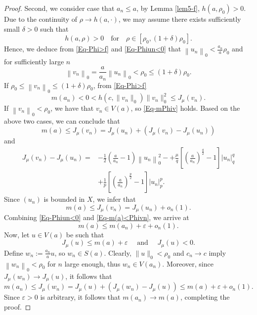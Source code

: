 \documentclass[11pt]{amsart}
\numberwithin{equation}{section}
\begin{document}
{{\begin{proof}
        Second, we consider case that $a_n \leq a$, by Lemma \ref{lem5-f},
        $ h\left(a, \rho_0\right) > 0 $.
        Due to the continuity of $\rho \rightarrow h(a, \cdot)$, we may assume there exists sufficiently small
        $\delta>0$ such that
        $$
        h\left(a, \rho\right) > 0\quad \text{for}\quad \rho \in\left[\rho_0, (1+\delta)\rho_0\right].
        $$
        Hence, we deduce from \eqref{Eq-Phi>f} and \eqref{Eq-Phiun<0} that
        $\left\| u_n\right\|_0<\frac{a_n}{a}  \rho_0$ and
        for sufficiently large $n$
        $$
        \left\| v_n\right\|_{0}=\frac{a}{a_n}\left\| u_n\right\|_{0}< \rho_0\leq(1+\delta)\rho_0.
        $$
        If $\rho_0\leq\left\|v_n\right\|_{0}\leq(1+\delta)\rho_0$, from
        \eqref{Eq-Phi>f}
        $$
        m(a_n)<0<h\left(c,\|v_n\|_{0}\right)\| v_n\|_{0}^{2}\leq J_\mu\left(v_n\right).
        $$
        If $\left\|v_n\right\|_{0}<\rho_0$, we have that $v_n \in V(a)$, so \eqref{Eq-mPhiv} holds. Based on the above two cases, we can conclude that
        \begin{equation}
            m(a) \leq J_\mu\left(v_n\right)=J_\mu\left(u_n\right)+\left(J_\mu\left(v_n\right)-J_\mu\left(u_n\right)\right)
        \end{equation}
        and
        \begin{equation}
            \begin{aligned}
                J_\mu\left(v_n\right) - J_\mu\left(u_n\right) = & -\frac{1}{2} \left( \frac{a}{a_n} - 1 \right) \left\| u_n\right\|_0^2
                -
                 + \frac{\mu}{q} \left[ \left( \frac{a}{a_n} \right)^{\frac{q}{2}} - 1 \right] \left|u_n\right|_q^q \\
                &+ \frac{1}{p} \left[ \left( \frac{a}{a_n} \right)^{\frac{p}{2}} - 1 \right] \left|u_n\right|_{p}^{p}.
            \end{aligned}
        \end{equation}
        Since $ (u_n) $ is bounded in $X$, {we infer that}
        \begin{equation}\label{Eq-m(a)<Phivn}
            m(a) \leq J_\mu\left(v_n\right)=J_\mu\left(u_n\right)+o_n(1).
        \end{equation}
        Combining \eqref{Eq-Phiun<0} and \eqref{Eq-m(a)<Phivn}, {we arrive at}
        $$
        m(a) \leq m\left(a_n\right)+\varepsilon+o_n(1) .
        $$
        Now, let $u \in V(a)$ be such that
        $$
        J_\mu(u) \leq m(a)+\varepsilon \quad \text { and } \quad J_\mu(u)<0 .
        $$
        Define $w_n:={\frac{a_n}{a}} u$, so $w_n \in S\left(a\right)$. Clearly, $\| u\|_{0}<\rho_0$ and $c_n \rightarrow c$ imply $\left\| w_n\right\|_{0}<\rho_0$ for $n$ large enough, thus $w_n \in V\left(a_n\right)$. Moreover, since $J_\mu\left(w_n\right) \rightarrow J_\mu(u)$, it follows that
        $$
        m\left(a_n\right) \leq J_\mu\left(w_n\right)=J_\mu(u)+\left(J_\mu\left(w_n\right)-J_\mu(u)\right) \leq m(a)+\varepsilon+o_n(1).
        $$
    Since $\varepsilon>0$ is arbitrary, it follows that $m\left(a_n\right) \rightarrow m(a)$, completing the proof.
    \end{proof}

}}
\end{document}
